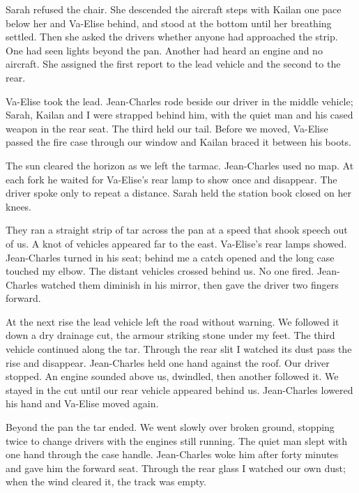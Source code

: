 Sarah refused the chair. She descended the aircraft steps with Kailan one pace below her and Va-Elise behind, and stood at the bottom until her breathing settled. Then she asked the drivers whether anyone had approached the strip. One had seen lights beyond the pan. Another had heard an engine and no aircraft. She assigned the first report to the lead vehicle and the second to the rear.\par

Va-Elise took the lead. Jean-Charles rode beside our driver in the middle vehicle; Sarah, Kailan and I were strapped behind him, with the quiet man and his cased weapon in the rear seat. The third held our tail. Before we moved, Va-Elise passed the fire case through our window and Kailan braced it between his boots.\par

The sun cleared the horizon as we left the tarmac. Jean-Charles used no map. At each fork he waited for Va-Elise's rear lamp to show once and disappear. The driver spoke only to repeat a distance. Sarah held the station book closed on her knees.\par

They ran a straight strip of tar across the pan at a speed that shook speech out of us. A knot of vehicles appeared far to the east. Va-Elise's rear lamps showed. Jean-Charles turned in his seat; behind me a catch opened and the long case touched my elbow. The distant vehicles crossed behind us. No one fired. Jean-Charles watched them diminish in his mirror, then gave the driver two fingers forward.\par

At the next rise the lead vehicle left the road without warning. We followed it down a dry drainage cut, the armour striking stone under my feet. The third vehicle continued along the tar. Through the rear slit I watched its dust pass the rise and disappear. Jean-Charles held one hand against the roof. Our driver stopped. An engine sounded above us, dwindled, then another followed it. We stayed in the cut until our rear vehicle appeared behind us. Jean-Charles lowered his hand and Va-Elise moved again.\par

Beyond the pan the tar ended. We went slowly over broken ground, stopping twice to change drivers with the engines still running. The quiet man slept with one hand through the case handle. Jean-Charles woke him after forty minutes and gave him the forward seat. Through the rear glass I watched our own dust; when the wind cleared it, the track was empty.\par

